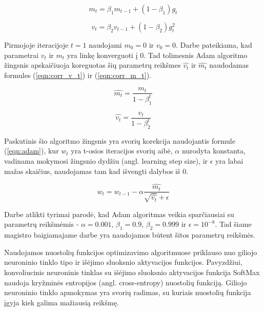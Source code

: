 \begin{equation}
\label{eqn:m_t}
	m_t = \beta_1 m_{t-1} + (1 - \beta_1)g_t
\end{equation}

\begin{equation}
\label{eqn:v_t}
	v_t = \beta_2 v_{t-1} + (1 - \beta_2)g_t^2
\end{equation}

Pirmojoje iteracijoje $t = 1$ naudojami $m_0 = 0$ ir $v_0 = 0$. Darbe \cite{adam} pateikiama, kad parametrai $v_t$ ir $m_t$ yra linkę konverguoti į 0. Tad tolimesnis Adam algoritmo žingsnis apskaičiuoja koreguotas šių parametrų reikšmes $\hat{v_t}$ ir $\hat{m_t}$ naudodamas formules (\ref{eqn:corr_v_t}) ir (\ref{eqn:corr_m_t}).

\begin{equation}
\label{eqn:corr_m_t}
	\hat{m_t} = \dfrac{m_t}{1 - \beta_1^t}
\end{equation}

\begin{equation}
\label{eqn:corr_v_t}
	\hat{v_t} = \dfrac{v_t}{1 - \beta_2^t}
\end{equation}

Paskutinis šio algoritmo žingsnis yra svorių korekcija naudojantis formule (\ref{eqn:adam}), kur $w_t$ yra t-osios iteracijos svorių aibė, $\alpha$ nurodyta konstanta, vadinama mokymosi žingsnio dydžiu (angl. learning step size), ir $\epsilon$ yra labai mažas skaičius, naudojamas tam kad išvengti dalybos iš 0.

\begin{equation}
\label{eqn:adam}
	w_t = w_{t-1} - \alpha \dfrac{\hat{m_t}}{\sqrt{\hat{v_t}} + \epsilon}
\end{equation}

Darbe \cite{adam} atlikti tyrimai parodė, kad Adam algoritmas veikia sparčiausiai su parametrų reikšmėmis - $\alpha = 0.001$, $\beta_1 = 0.9$, $\beta_2 = 0.999$ ir $\epsilon = 10^{-8}$. Tad šiame magistro baigiamajame darbe yra naudojamos būtent šitos parametrų reikšmės.

Naudojamos nuostolių funkcijos optimizavimo algoritmuose priklauso nuo giliojo neuroninio tinklo tipo ir išėjimo sluoksnio aktyvacijos funkcijos. Pavyzdžiui, konvoliucinis neuroninis tinklas su išėjimo sluoksnio aktyvacijos funkcija SoftMax naudoja kryžminės entropijos (angl. cross-entropy) nuostolių funkciją. Giliojo neuroninio tinklo apmokymas yra svorių radimas, su kuriais nuostolių funkcija įgyja kiek galima mažiausią reikšmę.

